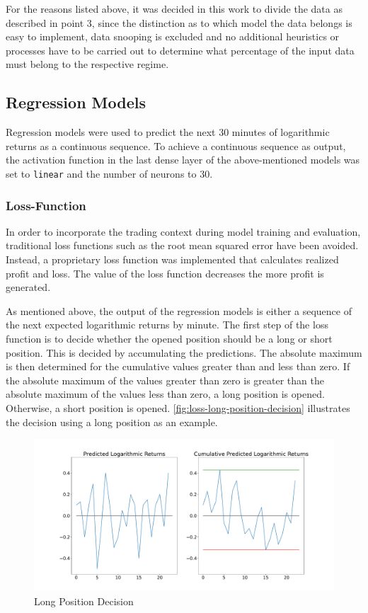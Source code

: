 \noindent
For the reasons listed above, it was decided in this work to divide the data as described in point 3, since the distinction as to which model the data belongs is easy to implement, data snooping is excluded and no additional heuristics or processes have to be carried out to determine what percentage of the input data must belong to the respective regime.

\subsection{Regression Models}
\label{chap:regression-models}

Regression models were used to predict the next 30 minutes of logarithmic returns as a continuous sequence.
To achieve a continuous sequence as output, the activation function in the last dense layer of the above-mentioned models was set to \texttt{linear} and the number of neurons to 30.

\subsubsection{Loss-Function}
\label{chap:regression-loss}

In order to incorporate the trading context during model training and evaluation, traditional loss functions such as the root mean squared error have been avoided.
Instead, a proprietary loss function was implemented that calculates realized profit and loss.
The value of the loss function decreases the more profit is generated.

As mentioned above, the output of the regression models is either a sequence of the next expected logarithmic returns by minute.
The first step of the loss function is to decide whether the opened position should be a long or short position.
This is decided by accumulating the predictions.
The absolute maximum is then determined for the cumulative values greater than and less than zero.
If the absolute maximum of the values greater than zero is greater than the absolute maximum of the values less than zero, a long position is opened.
Otherwise, a short position is opened.
\autoref{fig:loss-long-position-decision} illustrates the decision using a long position as an example.

\begin{figure}[H]
    \centering
    \includegraphics[width=\textwidth]{images/models/loss_direction}
    \caption{Long Position Decision}
    \label{fig:loss-long-position-decision}
\end{figure}

